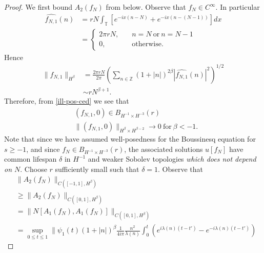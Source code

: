\documentclass[12pt,reqno]{amsart}
\numberwithin{equation}{section}  %
\newcommand{\zz}{\mathbb{Z}}
\newcommand{\ci}{\mathbb{T}}
\newcommand{\wh}{\widehat}
\begin{document}
\begin{proof}
  We first bound $A_{2}(f_{N})$ from below.
  Observe that $f_{N} \in C^{\infty}$. In particular
%
%
\begin{equation}
  \label{ill-pos-ce}
\begin{split}
  \wh{f_{N,1}}(n)
  & = r N\int_{\ci} [e^{-ix(n - N)} + e^{-ix(n - (N-1))}]  dx  
  \\ 
  & = 
  \begin{cases}
    2 \pi r N,  \quad  & n = N \ \text{or} \ n = N-1
    \\
     0, \quad  & \text{otherwise}.
  \end{cases}
\end{split}
\end{equation}
%
Hence
%
%
\begin{equation}
  \label{ill-pos-ced}
\begin{split}
  \| f_{N,1} \|_{H^{\beta}}
  & = \frac{2 \pi r N}{2 \pi} \left( \sum_{n \in \zz} (1 + | n |)^{2 \beta} |
  \wh{f_{N,1}}(n) |^{2} \right)^{1/2}
  \\
  & \sim rN^{\beta +1}.
\end{split}
\end{equation}
%
%
Therefore, from \eqref{ill-pos-ced} we see that 
\begin{equation*}
  \begin{split}
    & (f_{N,1}, 0) \in B_{H^{-1} \times H^{-3}}(r)
    \\
    & \|(f_{N,1}, 0)\|_{H^{\beta} \times H^{\beta -2}} \to 0 \ \text{for} \ \beta < -1.
    \end{split}
\end{equation*}
Note that since we have assumed well-posedness for the Boussinesq equation for $s
\ge -1$, and since $f_{N} \in B_{H^{-1} \times H^{-3}}(r)$, the associated
solutions $u[f_{N}]$ have common lifespan $\delta$ in $H^{-1}$ and weaker Sobolev topologies \emph{which does not depend
on $N$}. Choose $r$ sufficiently small such that $\delta =1$.  
Observe that
%
%
\begin{equation*}
\begin{split}
  & \| A_{2}(f_{N}) \|_{C([-1, 1], H^{\beta})} 
  \\
& \ge \| A_{2}(f_{N}) \|_{C([0, 1], H^{\beta})} 
\\
  &  =  \| N[A_{1}(f_{N}), A_{1}(f_{N})] \|_{C([0, 1],
  H^{\beta})} 
  \\
  & = \sup_{0 \le t \le 1} \| \psi_{1}(t) (1 + | n |)^{\beta}
  \frac{1}{4 i \pi} \frac{n^{2}}{\lambda(n)}
  \int_{0}^{t} \left( e^{i\lambda(n)(t-t')} - e^{-i\lambda(n)(t-t')} \right)

\end{split}
\end{equation*}
\end{proof}
\end{document}
